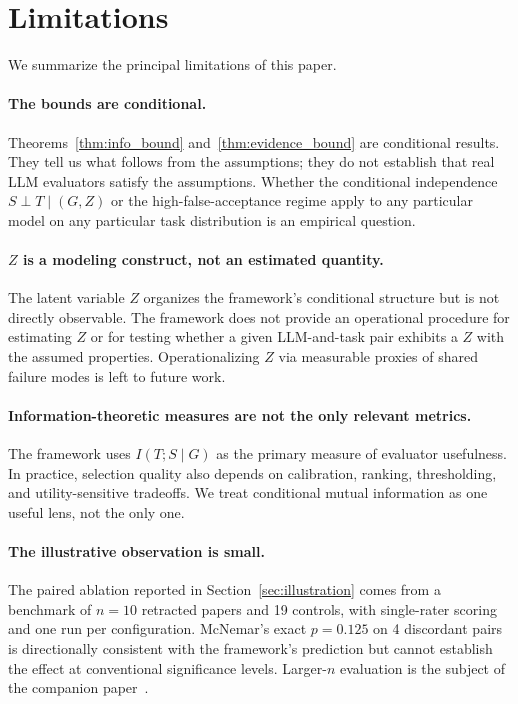 \documentclass[11pt]{article}
\begin{document}
\section{Limitations}

We summarize the principal limitations of this paper.

\paragraph{The bounds are conditional.} Theorems~\ref{thm:info_bound} and~\ref{thm:evidence_bound} are conditional results. They tell us what follows from the assumptions; they do not establish that real LLM evaluators satisfy the assumptions. Whether the conditional independence $S \perp T \mid (G, Z)$ or the high-false-acceptance regime apply to any particular model on any particular task distribution is an empirical question.

\paragraph{$Z$ is a modeling construct, not an estimated quantity.} The latent variable $Z$ organizes the framework's conditional structure but is not directly observable. The framework does not provide an operational procedure for estimating $Z$ or for testing whether a given LLM-and-task pair exhibits a $Z$ with the assumed properties. Operationalizing $Z$ via measurable proxies of shared failure modes is left to future work.

\paragraph{Information-theoretic measures are not the only relevant metrics.} The framework uses $I(T; S \mid G)$ as the primary measure of evaluator usefulness. In practice, selection quality also depends on calibration, ranking, thresholding, and utility-sensitive tradeoffs. We treat conditional mutual information as one useful lens, not the only one.

\paragraph{The illustrative observation is small.} The paired ablation reported in Section~\ref{sec:illustration} comes from a benchmark of $n = 10$ retracted papers and 19 controls, with single-rater scoring and one run per configuration. McNemar's exact $p = 0.125$ on 4 discordant pairs is directionally consistent with the framework's prediction but cannot establish the effect at conventional significance levels. Larger-$n$ evaluation is the subject of the companion paper~\citep{brilliant2026benchmark}.
\end{document}
